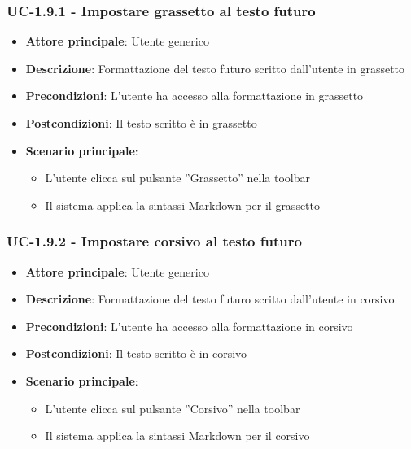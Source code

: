 \documentclass[11pt,a4paper]{article}
\begin{document}
\subsubsection{UC-1.9.1 - Impostare grassetto al testo futuro}
\begin{itemize}
    \item \textbf{Attore principale}: Utente generico
    \item \textbf{Descrizione}: Formattazione del testo futuro scritto dall’utente in grassetto
    \item \textbf{Precondizioni}: L’utente ha accesso alla formattazione in grassetto
    \item \textbf{Postcondizioni}: Il testo scritto è in grassetto
    \item \textbf{Scenario principale}:
        \begin{itemize}
            \item L’utente clicca sul pulsante ”Grassetto” nella toolbar
            \item Il sistema applica la sintassi Markdown per il grassetto
        \end{itemize}
\end{itemize}

\subsubsection{UC-1.9.2 - Impostare corsivo al testo futuro}
\begin{itemize}
    \item \textbf{Attore principale}: Utente generico
    \item \textbf{Descrizione}: Formattazione del testo futuro scritto dall’utente in corsivo
    \item \textbf{Precondizioni}: L’utente ha accesso alla formattazione in corsivo
    \item \textbf{Postcondizioni}: Il testo scritto è in corsivo
    \item \textbf{Scenario principale}:
        \begin{itemize}
            \item L’utente clicca sul pulsante ”Corsivo” nella toolbar
            \item Il sistema applica la sintassi Markdown per il corsivo
        \end{itemize}
\end{itemize}
\end{document}
